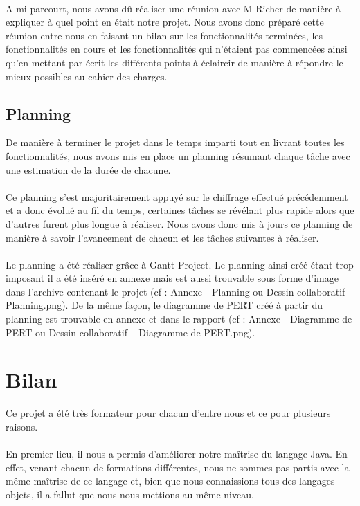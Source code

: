 \documentclass[a4paper,11pt]{article}
\begin{document}
\paragraph{} A mi-parcourt, nous avons dû réaliser une réunion avec M Richer de manière à expliquer à quel point en était notre projet. Nous avons donc préparé cette réunion entre nous en faisant un bilan sur les fonctionnalités terminées, les fonctionnalités en cours et les fonctionnalités qui n'étaient pas commencées ainsi qu'en mettant par écrit les différents points à éclaircir de manière à répondre le mieux possibles au cahier des charges.

\subsection{Planning}
De manière à terminer le projet dans le temps imparti tout en livrant toutes les fonctionnalités, nous avons mis en place un planning résumant chaque tâche avec une estimation de la durée de chacune.

\paragraph{} Ce planning s'est majoritairement appuyé sur le chiffrage effectué précédemment et a donc évolué au fil du temps, certaines tâches se révélant plus rapide alors que d'autres furent plus longue à réaliser. Nous avons donc mis à jours ce planning de manière à savoir l'avancement de chacun et les tâches suivantes à réaliser.

\paragraph{} Le planning a été réaliser grâce à Gantt Project. Le planning ainsi créé étant trop imposant il a été inséré en annexe mais est aussi trouvable sous forme d'image dans l'archive contenant le projet (cf : Annexe - Planning ou Dessin collaboratif – Planning.png). De la même façon, le diagramme de PERT créé à partir du planning est trouvable en annexe et dans le rapport (cf : Annexe - Diagramme de PERT ou Dessin collaboratif – Diagramme de PERT.png).

\section{Bilan}
Ce projet a été très formateur pour chacun d'entre nous et ce pour plusieurs raisons.

\paragraph{} En premier lieu, il nous a permis d'améliorer notre maîtrise du langage Java. En effet, venant chacun de formations différentes, nous ne sommes pas partis avec la même maîtrise de ce langage et, bien que nous connaissions tous des langages objets, il a fallut que nous nous mettions au même niveau.
\end{document}
